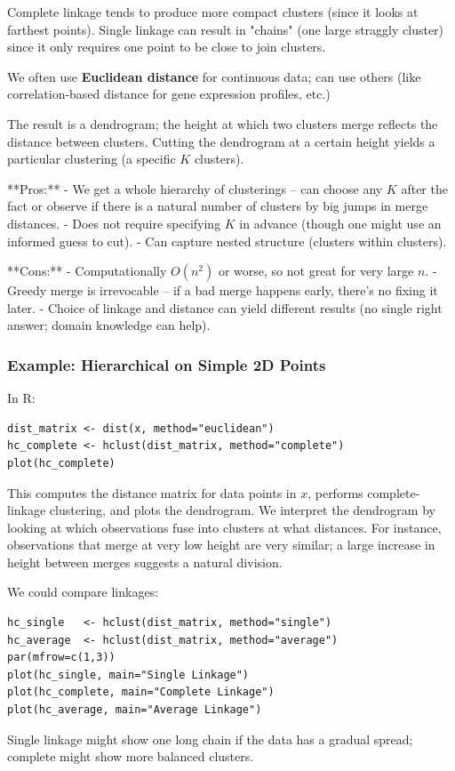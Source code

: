 \documentclass[11pt]{article}
\begin{document}
Complete linkage tends to produce more compact clusters (since it looks at farthest points). Single linkage can result in "chains" (one large straggly cluster) since it only requires one point to be close to join clusters.

We often use \textbf{Euclidean distance} for continuous data; can use others (like correlation-based distance for gene expression profiles, etc.)

The result is a dendrogram; the height at which two clusters merge reflects the distance between clusters. Cutting the dendrogram at a certain height yields a particular clustering (a specific $K$ clusters).

**Pros:**
- We get a whole hierarchy of clusterings – can choose any $K$ after the fact or observe if there is a natural number of clusters by big jumps in merge distances.
- Does not require specifying $K$ in advance (though one might use an informed guess to cut).
- Can capture nested structure (clusters within clusters).

**Cons:**
- Computationally $O(n^2)$ or worse, so not great for very large $n$.
- Greedy merge is irrevocable – if a bad merge happens early, there's no fixing it later.
- Choice of linkage and distance can yield different results (no single right answer; domain knowledge can help).

\subsubsection*{Example: Hierarchical on Simple 2D Points}
In R:
\begin{verbatim}
dist_matrix <- dist(x, method="euclidean")
hc_complete <- hclust(dist_matrix, method="complete")
plot(hc_complete)
\end{verbatim}
This computes the distance matrix for data points in $x$, performs complete-linkage clustering, and plots the dendrogram. We interpret the dendrogram by looking at which observations fuse into clusters at what distances. For instance, observations that merge at very low height are very similar; a large increase in height between merges suggests a natural division.

We could compare linkages:
\begin{verbatim}
hc_single   <- hclust(dist_matrix, method="single")
hc_average  <- hclust(dist_matrix, method="average")
par(mfrow=c(1,3))
plot(hc_single, main="Single Linkage")
plot(hc_complete, main="Complete Linkage")
plot(hc_average, main="Average Linkage")
\end{verbatim}
Single linkage might show one long chain if the data has a gradual spread; complete might show more balanced clusters.
\end{document}
